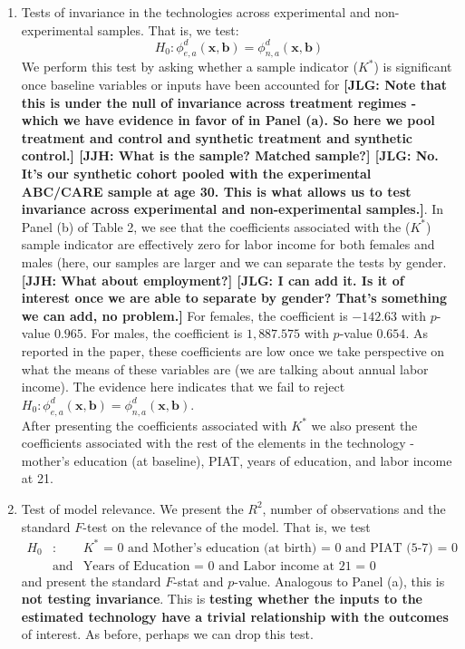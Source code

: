 \begin{enumerate}
\item Tests of invariance in the technologies across experimental and non-experimental samples. That is, we test:
	\begin{equation} 
	H_0: \phi_{e,a}^d \left( \bm{x}, \bm{b} \right) = \phi_{n,a}^d \left( \bm{x}, \bm{b} \right)  
	\end{equation}
\noindent We perform this test by asking whether a sample indicator ($K^*$) is significant once baseline variables or inputs have been accounted for \textbf{[JLG: Note that this is under the null of invariance across treatment regimes - which we have evidence in favor of in Panel (a). So here we pool treatment and control and synthetic treatment and synthetic control.] [JJH: What is the sample? Matched sample?] [JLG: No. It's our synthetic cohort pooled with the experimental ABC/CARE sample at age 30. This is what allows us to test invariance across experimental and non-experimental samples.]}. In Panel (b) of Table 2, we see that the coefficients associated with the ($K^*$) sample indicator are effectively zero for labor income for both females and males (here, our samples are larger and we can separate the tests by gender. \textbf{[JJH: What about employment?] [JLG: I can add it. Is it of interest once we are able to separate by gender? That's something we can add, no problem.]} For females, the coefficient is $-142.63$ with $p$-value $0.965$. For males, the coefficient is $1,887.575$ with $p$-value $0.654$. As reported in the paper, these coefficients are low once we take perspective on what the means of these variables are (we are talking about annual labor income). The evidence here indicates that we fail to reject $H_0: \phi_{e,a}^d \left( \bm{x}, \bm{b} \right) = \phi_{n,a}^d \left( \bm{x}, \bm{b} \right)$.\\ 

\noindent After presenting the coefficients associated with $K^*$ we also present the coefficients associated with the rest of the elements in the technology - mother's education (at baseline), PIAT, years of education, and labor income at 21.\\

\item Test of model relevance. We present the $R^2$, number of observations and the standard $F$-test on the relevance of the model. That is, we test 
	\begin{eqnarray} 
	H_0&:& \text{$K^*$ = 0 and Mother's education (at birth) = 0 and PIAT (5-7) = 0} \nonumber \\ 
	      & \text{and} & \text{Years of Education = 0 and Labor income at 21 = 0}
	\end{eqnarray}
\noindent and present the standard $F$-stat and $p$-value. Analogous to Panel (a), this is \textbf{not testing invariance}. This is \textbf{testing whether the inputs to the estimated technology have a trivial relationship with the outcomes} of interest. As before, perhaps we can drop this test.\\


\end{enumerate}

